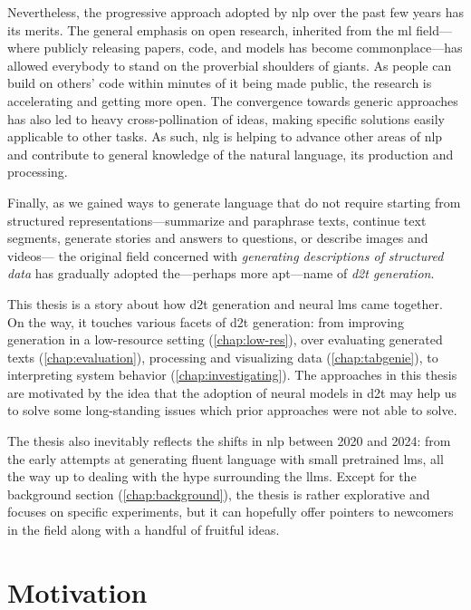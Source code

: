 Nevertheless, the progressive approach adopted by \ac{nlp} over the past few years has its merits. The general emphasis on open research, inherited from the \ac{ml} field---where publicly releasing papers, code, and models has become commonplace---has allowed everybody to stand on the proverbial shoulders of giants. As people can build on others' code within minutes of it being made public, the research is accelerating and getting more open. The convergence towards generic approaches has also led to heavy cross-pollination of ideas, making specific solutions easily applicable to other tasks. As such, \ac{nlg} is helping to advance other areas of \ac{nlp} and contribute to general knowledge of the natural language, its production and processing.

Finally, as we gained ways to generate language that do not require starting from structured representations---summarize and paraphrase texts, continue text segments, generate stories and answers to questions, or describe images and videos---%
the original field concerned with \textit{generating descriptions of structured data} has gradually adopted the---perhaps more apt---name of \emph{\ac{d2t} generation}.

This thesis is a story about how \acl{d2t} generation and neural \aclp{lm} came together. On the way, it touches various facets of \ac{d2t} generation: from improving generation in a low-resource setting (\autoref{chap:low-res}), over evaluating generated texts (\autoref{chap:evaluation}), processing and visualizing data (\autoref{chap:tabgenie}), to interpreting system behavior (\autoref{chap:investigating}). The approaches in this thesis are motivated by the idea that the adoption of neural models in \ac{d2t} may help us to solve some long-standing issues which prior approaches were not able to solve.

The thesis also inevitably reflects the shifts in \ac{nlp} between 2020 and 2024: from the early attempts at generating fluent language with small pretrained \acp{lm}, all the way up to dealing with the hype surrounding the \acp{llm}.  Except for the background section (\autoref{chap:background}), the thesis is rather explorative and focuses on specific experiments, but it can hopefully offer pointers to newcomers in the field along with a handful of fruitful ideas.




\section{Motivation}
\label{sec:rq}

